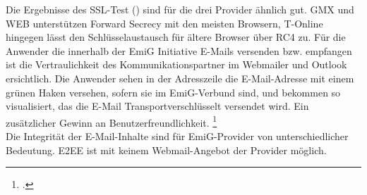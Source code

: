 \documentclass  [paper=a4,
				fontsize=12pt,
				listof=totoc,
				bibliography=totoc
				]{scrreprt}
\begin{document}
			Die Ergebnisse des SSL-Test () sind für die drei Provider ähnlich gut. GMX und WEB unterstützen Forward Secrecy mit den meisten Browsern, T-Online hingegen lässt den Schlüsselaustausch für ältere Browser über RC4 zu.
			Für die Anwender die innerhalb der EmiG Initiative E-Mails versenden bzw. empfangen ist die Vertraulichkeit des Kommunikationspartner im Webmailer und Outlook ersichtlich.
			Die Anwender sehen in der Adresszeile die E-Mail-Adresse mit einem grünen Haken versehen, sofern sie im EmiG-Verbund sind, und bekommen so visualisiert, das die E-Mail Transportverschlüsselt versendet wird. Ein zusätzlicher Gewinn an Benutzerfreundlichkeit.
			\footcite[Vgl.][]{Zivadino14-1}\medskip\\
			Die Integrität der E-Mail-Inhalte sind für EmiG-Provider von unterschiedlicher Bedeutung.
			\acf{E2EE} ist mit keinem Webmail-Angebot der Provider möglich.
\end{document}

